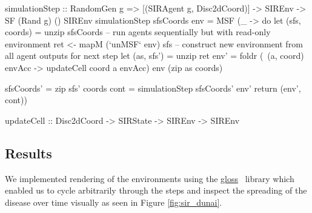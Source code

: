 \begin{HaskellCode}
simulationStep :: RandomGen g => [(SIRAgent g, Disc2dCoord)]
               -> SIREnv -> SF (Rand g) () SIREnv
simulationStep sfsCoords env = MSF (\_ -> do
  let (sfs, coords) = unzip sfsCoords 
  -- run agents sequentially but with read-only environment
  ret <- mapM (`unMSF` env) sfs
  -- construct new environment from all agent outputs for next step
  let (as, sfs') = unzip ret
      env' = foldr (\ (a, coord) envAcc -> updateCell coord a envAcc) 
                   env (zip as coords)

      sfsCoords' = zip sfs' coords
      cont       = simulationStep sfsCoords' env'
  return (env', cont))
 
updateCell :: Disc2dCoord -> SIRState -> SIREnv -> SIREnv
\end{HaskellCode}

\subsection{Results}
We implemented rendering of the environments using the  \href{http://hackage.haskell.org/package/gloss}{gloss}~\cite{gloss_library} library which enabled us to cycle arbitrarily through the steps and inspect the spreading of the disease over time visually as seen in Figure \ref{fig:sir_dunai}.

